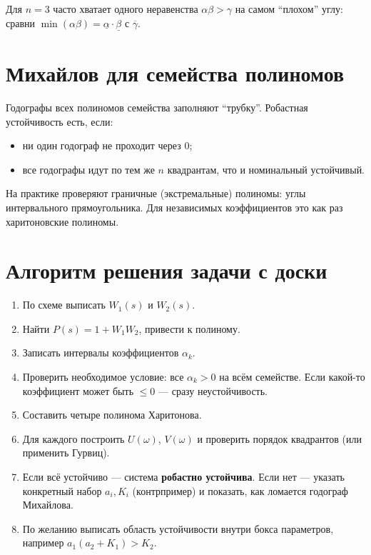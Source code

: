 \documentclass[11pt,a4paper]{article}
\begin{document}
Для \(n=3\) часто хватает одного неравенства \(\alpha\beta>\gamma\) на самом ``плохом'' углу:
сравни \(\min(\alpha\beta)=\underline\alpha\cdot\underline\beta\) с \(\overline\gamma\).

\section{Михайлов для семейства полиномов}

Годографы всех полиномов семейства заполняют ``трубку''.
Робастная устойчивость есть, если:
\begin{itemize}
  \item ни один годограф не проходит через \(0\);
  \item все годографы идут по тем же \(n\) квадрантам, что и номинальный устойчивый.
\end{itemize}

На практике проверяют граничные (экстремальные) полиномы: углы интервального прямоугольника.
Для независимых коэффициентов это как раз харитоновские полиномы.

\section{Алгоритм решения задачи с доски}

\begin{enumerate}
  \item По схеме выписать \(W_1(s)\) и \(W_2(s)\).
  \item Найти \(P(s)=1+W_1 W_2\), привести к полиному.
  \item Записать интервалы коэффициентов \(\alpha_k\).
  \item Проверить необходимое условие: все \(\alpha_k>0\) на всём семействе.
        Если какой-то коэффициент может быть \(\le 0\) --- сразу неустойчивость.
  \item Составить четыре полинома Харитонова.
  \item Для каждого построить \(U(\omega)\), \(V(\omega)\) и проверить порядок квадрантов
        (или применить Гурвиц).
  \item Если всё устойчиво --- система \textbf{робастно устойчива}.
        Если нет --- указать конкретный набор \(a_i,K_i\) (контрпример)
        и показать, как ломается годограф Михайлова.
  \item По желанию выписать область устойчивости внутри бокса параметров,
        например \(a_1(a_2+K_1)>K_2\).
\end{enumerate}
\end{document}
